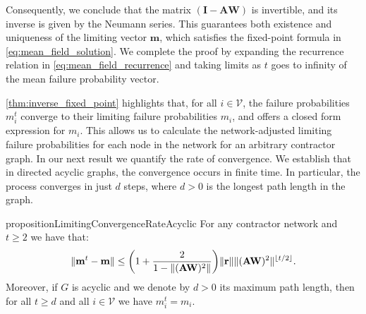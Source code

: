 \documentclass[mnsc,nonblindrev]{informs3}
\newcommand{\rvec}{\mathbf{r}}
\newcommand{\A}{\mathbf{A}}
\newcommand{\W}{\mathbf{W}}
\newcommand{\I}{\mathbf{I}}
\newcommand{\mean}{m}
\newcommand{\meanvec}{\mathbf{\mean}}
\DeclarePairedDelimiter{\norm}{\lVert}{\rVert}
\let\originalleft\left
\let\originalright\right
\renewcommand{\left}{\mathopen{}\mathclose\bgroup\originalleft}
\renewcommand{\right}{\aftergroup\egroup\originalright}
\begin{document}
{Consequently, we conclude that the matrix $(\I - \A\W)$ is invertible, and its inverse is given by the Neumann series.  This guarantees both existence and uniqueness of the limiting vector $\meanvec$, which satisfies the fixed-point formula in \cref{eq:mean_field_solution}.  We complete the proof by expanding the recurrence relation in \cref{eq:mean_field_recurrence} and taking limits as $t$ goes to infinity of the mean failure probability vector.}

\cref{thm:inverse_fixed_point} highlights that, for all $i \in \mathcal{V}$, the failure probabilities $\mean_i^t$ converge to their limiting failure probabilities $\mean_i$, and offers a closed form expression for $\mean_i$.  This allows us to calculate the network-adjusted limiting failure probabilities for each node in the network for an arbitrary contractor graph.  In our next result we quantify the rate of convergence.
We establish that in directed acyclic graphs, the convergence occurs in finite time.  In particular, the process converges in just $d$ steps, where $d  > 0$ is the longest path length in the graph.


\begin{restatable}{proposition}{LimitingConvergenceRateAcyclic}
\label{thm:limiting_probabilities_rate_of_convergence}
For any contractor network and $t \geq 2$ we have that:
    \[
    \norm{\meanvec^t - \meanvec} \leq \left( 1 + \frac{2}{1 - \norm{(\A\W)^2}} \right) \norm{\rvec} \norm{(\A\W)^2}^{\lfloor t/2 \rfloor}.
    \]
Moreover, if $G$ is acyclic and we denote by $d > 0$
its maximum path length, then for all $t \geq d$ and all $i \in \mathcal{V}$ we have $\mean_i^t = \mean_i$.
\end{restatable}
\end{document}

